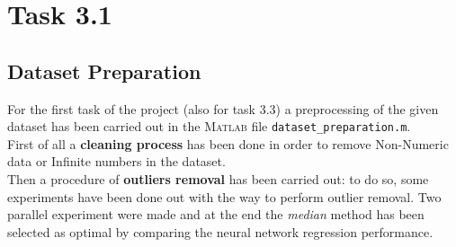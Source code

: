 \section{Task 3.1}
\subsection{Dataset Preparation}
For the first task of the project (also for task 3.3) a preprocessing of the given dataset has been carried out in the \textsc{Matlab} file \verb*|dataset_preparation.m|.\\

First of all a \textbf{cleaning process} has been done in order to remove Non-Numeric data or Infinite numbers in the dataset.\\
Then a procedure of \textbf{outliers removal} has been carried out: to do so, some experiments have been done out with the way to perform outlier removal. Two parallel experiment were made and at the end the \textit{median} method has been selected as optimal by comparing the neural network regression performance. \\

